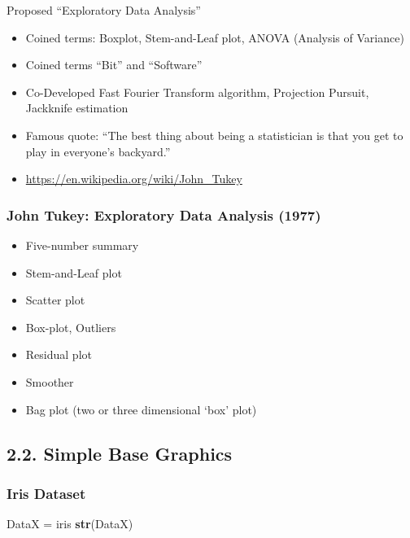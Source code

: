 \documentclass[
]{article}
\newenvironment{Shaded}{\begin{snugshade}}{\end{snugshade}}
\newcommand{\KeywordTok}[1]{\textcolor[rgb]{0.13,0.29,0.53}{\textbf{#1}}}
\newcommand{\NormalTok}[1]{#1}
\newcommand{\StringTok}[1]{\textcolor[rgb]{0.31,0.60,0.02}{#1}}
\begin{document}
Proposed ``Exploratory Data Analysis''

\begin{itemize}
\item
  Coined terms: Boxplot, Stem-and-Leaf plot, ANOVA (Analysis of
  Variance)
\item
  Coined terms ``Bit'' and ``Software''
\item
  Co-Developed Fast Fourier Transform algorithm, Projection Pursuit,
  Jackknife estimation
\item
  Famous quote: ``The best thing about being a statistician is that you
  get to play in everyone's backyard.''
\item
  \url{https://en.wikipedia.org/wiki/John_Tukey}
\end{itemize}

\hypertarget{john-tukey-exploratory-data-analysis-1977}{%
\subsubsection{John Tukey: Exploratory Data Analysis
(1977)}\label{john-tukey-exploratory-data-analysis-1977}}

\begin{itemize}
\item
  Five-number summary
\item
  Stem-and-Leaf plot
\item
  Scatter plot
\item
  Box-plot, Outliers
\item
  Residual plot
\item
  Smoother
\item
  Bag plot (two or three dimensional `box' plot)
\end{itemize}

\hypertarget{simple-base-graphics}{%
\subsection{2.2. Simple Base Graphics}\label{simple-base-graphics}}

\hypertarget{iris-dataset}{%
\subsubsection{Iris Dataset}\label{iris-dataset}}

\begin{Shaded}
\begin{Highlighting}[]
\NormalTok{DataX =}\StringTok{ }\NormalTok{iris  }
\KeywordTok{str}\NormalTok{(DataX)}
\end{Highlighting}
\end{Shaded}
\end{document}

